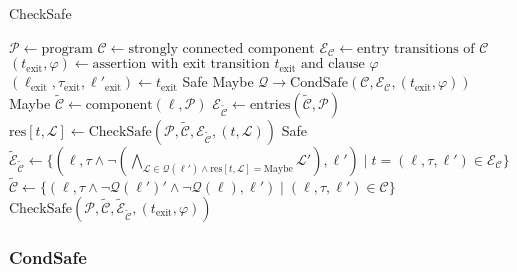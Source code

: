 \documentclass[12pt]{scrartcl}
\begin{document}
\begin{algorithm}
\caption{CheckSafe}\label{checksafe}
\begin{algorithmic}[1]
\State $\mathcal{P} \gets \text{program}$
\State $\mathcal{C} \gets \text{strongly connected component}$
\State $\mathcal{E}_\mathcal{C} \gets \text{entry transitions of } \mathcal{C}$
\State $(t_\text{exit}, \varphi) \gets \text{assertion with exit transition } t_\text{exit} \text{ and clause } \varphi$
\State $(\ell_\text{exit}, \tau_\text{exit}, \ell'_\text{exit}) \gets t_\text{exit}$
  \Return Safe
  \Return Maybe
\EndIf
\State $\mathcal{Q} \rightarrow \text{CondSafe}(\mathcal{C}, \mathcal{E}_\mathcal{C}, (t_\text{exit}, \varphi))$
  \Return Maybe
\EndIf
{}
  \State $\tilde{\mathcal{C}} \gets \text{component}(\ell, \mathcal{P})$
  \State $\mathcal{E}_{\tilde{\mathcal{C}}} \gets \text{entries}(\tilde{\mathcal{C}}, \mathcal{P})$
  \State $\text{res}[t, \mathcal{L}] \gets \text{CheckSafe}(\mathcal{P}, \tilde{\mathcal{C}}, \mathcal{E}_{\tilde{\mathcal{C}}}, (t, \mathcal{L}))$
\EndFor
{}
  \Return Safe
\Else
  \State $\tilde{\mathcal{E}}_{\tilde{\mathcal{C}}} \gets \lbrace (\ell, \tau \wedge \neg (\bigwedge_{\mathcal{L} \in \mathcal{Q}(\ell') \wedge \text{res}[t, \mathcal{L}]=\text{Maybe}}{\mathcal{L}'}), \ell') \mid t = (\ell, \tau, \ell') \in \mathcal{E}_\mathcal{C} \rbrace$
  \State $\tilde{\mathcal{C}} \gets \lbrace (\ell, \tau \wedge \neg\mathcal{Q}(\ell')' \wedge \neg\mathcal{Q}(\ell), \ell') \mid (\ell, \tau, \ell') \in \mathcal{C} \rbrace$
\EndIf
\Return $\text{CheckSafe}(\mathcal{P}, \tilde{\mathcal{C}}, \tilde{\mathcal{E}}_{\tilde{\mathcal{C}}}, (t_\text{exit}, \varphi))$
\end{algorithmic}
\end{algorithm}

\subsubsection{CondSafe}
\end{document}
